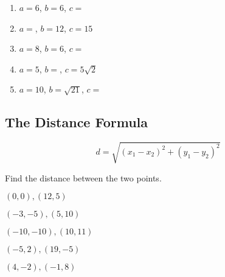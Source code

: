 \documentclass[12pt]{article}
\begin{document}
\begin{enumerate}
	\item $a=6$, \hspace{1cm} $b=6$,\hspace{1cm} $c=$\underline{\hspace{1in}}\\
	
	\item $a=$\underline{\hspace{1in}}, \hspace{1cm}$b=12$,\hspace{1cm} $c=15$\\
	
	\item $a=8$, \hspace{1cm}$b=6$, \hspace{1cm}$c=$\underline{\hspace{1in}}\\
	
	\item $a=5$, \hspace{1cm}$b=$\underline{\hspace{1in}}, \hspace{1cm}$c=5\sqrt{2}$\\
	
	\item $a=10$,\hspace{1cm} $b=\sqrt{21}$,\hspace{1cm} $c=$\underline{\hspace{1in}}
\end{enumerate}


\hrulefill

\subsection*{The Distance Formula}

$$d=\sqrt{(x_{1}-x_{2})^{2}+(y_{1}-y_{2})^{2}}$$

Find the distance between the two points.\\

\begin{enumerate}[resume]
\begin{multicols}{2}

	\item $(0,0),(12,5)$\\
	
	\item $(-3,-5),(5,10)$\\
	
	\item $(-10,-10),(10,11)$\\
	
	\item $(-5,2), (19,-5)$\\
	
	\item $(4,-2),(-1,8)$\\

\end{multicols}
\end{enumerate}
\end{document}
